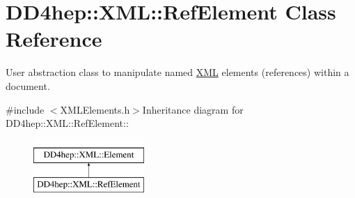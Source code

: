 \hypertarget{class_d_d4hep_1_1_x_m_l_1_1_ref_element}{
\section{DD4hep::XML::RefElement Class Reference}
\label{class_d_d4hep_1_1_x_m_l_1_1_ref_element}
}


User abstraction class to manipulate named \hyperlink{namespace_d_d4hep_1_1_x_m_l}{XML} elements (references) within a document.  


{\ttfamily \#include $<$XMLElements.h$>$}Inheritance diagram for DD4hep::XML::RefElement::\begin{figure}[H]
\begin{center}
\leavevmode
\includegraphics[height=2cm]{class_d_d4hep_1_1_x_m_l_1_1_ref_element}
\end{center}
\end{figure}
